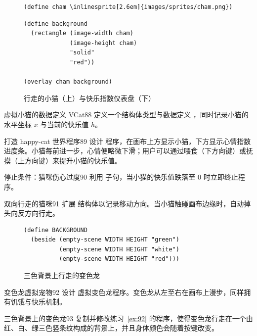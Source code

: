 \begin{figure}[htbp]
  \centering
\begin{stepperbox}[unbreakable]
\begin{Verbatim}[commandchars=\\\{\}, fontsize=\footnotesize]
(define cham \inlinesprite[2.6em]{images/sprites/cham.png})
\end{Verbatim}
\end{stepperbox}
\begin{lstlisting}[language=BSL]
(define background
  (rectangle (image-width cham)
             (image-height cham)
             "solid"
             "red"))

(overlay cham background)
\end{lstlisting}
  \caption{行走的小猫（上）与快乐指数仪表盘（下）}
  \label{fig:cat_and_gauge}
\end{figure}

\begin{exercise}{虚拟小猫的数据定义 VCat}{88}
定义一个结构体类型与数据定义 ，同时记录小猫的水平坐标 $x$ 与当前的快乐值 $h$。
\end{exercise}

\begin{exercise}{打造 happy-cat 世界程序}{89}
设计  程序，在画布上方显示小猫，下方显示心情指数进度条。小猫每前进一步，心情便略微下滑；用户可以通过喂食（下方向键）或抚摸（上方向键）来提升小猫的快乐值。
\end{exercise}

\begin{exercise}{停止条件：猫咪伤心过度}{90}
利用  子句，当小猫的快乐值跌落至 0 时立即终止程序。
\end{exercise}

\begin{exercise}{双向行走的猫咪}{91}
扩展  结构体以记录移动方向。当小猫触碰画布边缘时，自动掉头向反方向行走。
\end{exercise}

\begin{figure}[htbp]
  \centering
\begin{lstlisting}[language=BSL]
(define BACKGROUND
  (beside (empty-scene WIDTH HEIGHT "green")
          (empty-scene WIDTH HEIGHT "white")
          (empty-scene WIDTH HEIGHT "red")))
\end{lstlisting}
  \caption{三色背景上行走的变色龙}
  \label{fig:cham_tricolor}
\end{figure}

\begin{exercise}{变色龙虚拟宠物}{92}
设计  虚拟变色龙程序。变色龙从左至右在画布上漫步，同样拥有饥饿与快乐机制。
\end{exercise}

\begin{exercise}{三色背景上的变色龙}{93}
复制并修改练习~\ref{ex:92} 的程序，使得变色龙行走在一个由红、白、绿三色竖条纹构成的背景上，并且身体颜色会随着按键改变。
\end{exercise}
